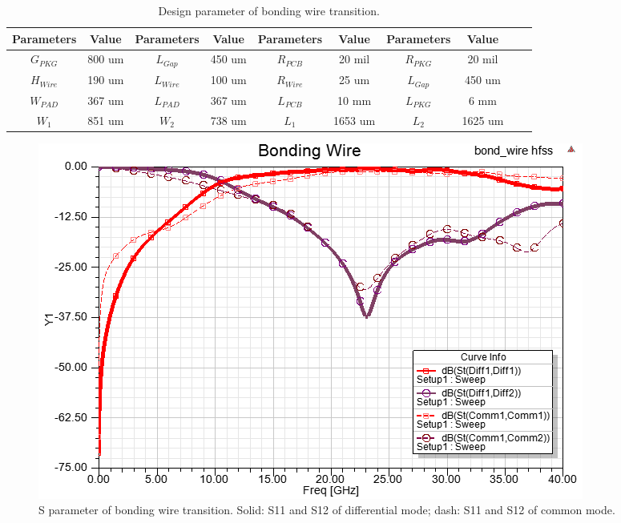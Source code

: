 \documentclass{book}  %
\begin{document}
\begin{paper}
\begin{table}[h]
	\renewcommand{\arraystretch}{1.3}	
	\begin{center}
		\begin{tabular}{| c | c | c | c | c | c | c | c | c | c |}
			\hline
			Parameters  & Value  & Parameters  & Value   & Parameters & Value   & Parameters & Value  \\ \hline
			$G_{PKG}$   & 800 um & $L_{Gap}$   & 450 um  & $R_{PCB}$  & 20 mil  & $R_{PKG}$  & 20 mil \\ \hline
			$H_{Wire}$  & 190 um & $L_{Wire}$  & 100 um  & $R_{Wire}$ & 25 um   & $L_{Gap}$  & 450 um \\ \hline
			$W_{PAD}$   & 367 um & $L_{PAD}$   & 367 um  & $L_{PCB}$  & 10 mm   & $L_{PKG}$  & 6 mm   \\ \hline
			$W_{1}$     & 851 um & $W_{2}$     & 738 um  & $L_{1}$    & 1653 um & $L_{2}$    & 1625 um   \\ \hline
		\end{tabular}
	\end{center}
	\label{table:bonding_wire_parameter}
	\caption{Design parameter of bonding wire transition.}
	\vskip0.2in
\end{table}

\begin{figure}[htbp!]
	\centering
	\includegraphics[width=0.8\columnwidth]{./img/PCB/Bonding_Wire/S_param.png}
	\caption{S parameter of bonding wire transition. Solid: S11 and S12 of differential mode; dash: S11 and S12 of common mode.}
	\label{fig:bonding_wire_S} %
\end{figure}


\end{paper}
\end{document}
